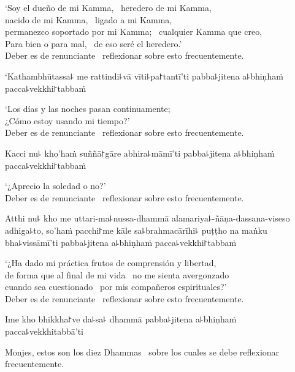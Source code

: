 \begin{english}
  ‘Soy el dueño de mi Kamma, \pause\ heredero de mi Kamma, \pause\\
  nacido de mi Kamma, \pause\ ligado a mi Kamma, \pause\\
  permanezco soportado por mi Kamma; \pause\ cualquier Kamma que creo, \pause\\
  Para bien o para mal, \pause\ de eso seré el heredero.’ \pause\\
  Deber es de renunciante \pause\ reflexionar sobre esto frecuentemente.
\end{english}

\clearpage

`Kathambhūtassa꜕ me rattindi꜕vā vīti꜕pa꜓tantī'ti pabba꜕jitena a꜕bhiṇhaṁ pacca꜕vekkhi꜓tabbaṁ

\begin{english}
  ‘Los días y las noches pasan continuamente; \pause\\
  ¿Cómo estoy usando mi tiempo?’ \pause\\
  Deber es de renunciante \pause\ reflexionar sobre esto frecuentemente.
\end{english}

Kacci nu꜕ kho'haṁ suññā꜓gāre abhira꜕māmī'ti pabba꜕jitena a꜕bhiṇhaṁ pacca꜕vekkhi꜓tabbaṁ

\begin{english}
  ‘¿Aprecio la soledad o no?’ \pause\\
  Deber es de renunciante \pause\ reflexionar sobre esto frecuentemente.
\end{english}

Atthi nu꜕ kho me uttari-ma꜕nussa-dhammā alamariya꜕-ñāṇa-dassana-viseso adhiga꜕to, so'haṁ pacchi꜓me kāle sa꜕brahmacārīhi꜕ puṭṭho na maṅku bha꜕vissāmī'ti pabba꜕jitena a꜕bhiṇhaṁ pacca꜕vekkhi꜓tabbaṁ

\begin{english}
  ‘¿Ha dado mi práctica frutos de comprensión y libertad, \pause\\ de forma que
  al final de mi vida \pause\ no me sienta avergonzado \pause\\
  cuando sea cuestionado \pause\ por mis compañeros espirituales?’ \pause\\
  Deber es de renunciante \pause\ reflexionar sobre esto frecuentemente.
\end{english}

Ime kho bhikkha꜓ve da꜕sa꜕ dhammā pabba꜕jitena a꜕bhiṇhaṁ pacca꜕vekkhitabbā'ti

\begin{english}
  Monjes, estos son los diez Dhammas \pause\ sobre los cuales se debe reflexionar frecuentemente.
\end{english}

